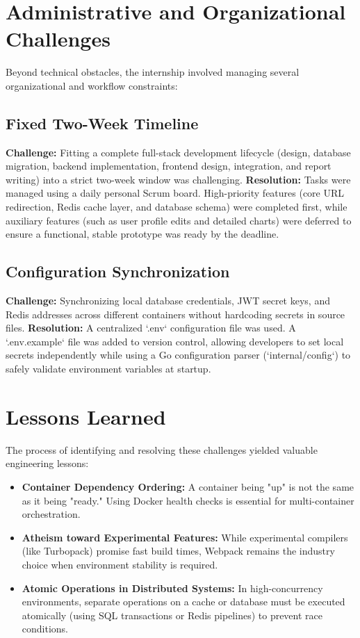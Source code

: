 \section{Administrative and Organizational Challenges}
Beyond technical obstacles, the internship involved managing several organizational and workflow constraints:

\subsection{Fixed Two-Week Timeline}
\textbf{Challenge:} Fitting a complete full-stack development lifecycle (design, database migration, backend implementation, frontend design, integration, and report writing) into a strict two-week window was challenging.
\textbf{Resolution:} Tasks were managed using a daily personal Scrum board. High-priority features (core URL redirection, Redis cache layer, and database schema) were completed first, while auxiliary features (such as user profile edits and detailed charts) were deferred to ensure a functional, stable prototype was ready by the deadline.

\subsection{Configuration Synchronization}
\textbf{Challenge:} Synchronizing local database credentials, JWT secret keys, and Redis addresses across different containers without hardcoding secrets in source files.
\textbf{Resolution:} A centralized `.env` configuration file was used. A `.env.example` file was added to version control, allowing developers to set local secrets independently while using a Go configuration parser (`internal/config`) to safely validate environment variables at startup.

\section{Lessons Learned}
The process of identifying and resolving these challenges yielded valuable engineering lessons:
\begin{itemize}
    \item \textbf{Container Dependency Ordering:} A container being "up" is not the same as it being "ready." Using Docker health checks is essential for multi-container orchestration.
    \item \textbf{Atheism toward Experimental Features:} While experimental compilers (like Turbopack) promise fast build times, Webpack remains the industry choice when environment stability is required.
    \item \textbf{Atomic Operations in Distributed Systems:} In high-concurrency environments, separate operations on a cache or database must be executed atomically (using SQL transactions or Redis pipelines) to prevent race conditions.
\end{itemize}
